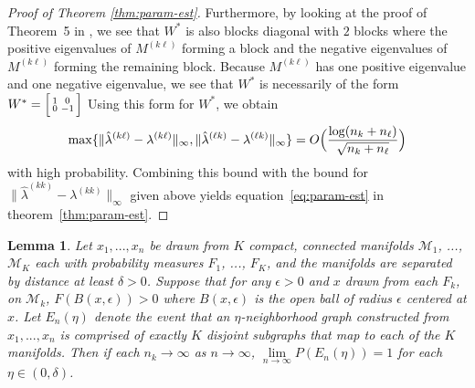 \documentclass[
  11pt,
]{article}
\newtheorem{lemma}{Lemma}[section]
\theoremstyle{definition}
\theoremstyle{definition}
\theoremstyle{definition}
\theoremstyle{definition}
\theoremstyle{remark}
\begin{document}
\begin{proof}[Proof of Theorem \ref{thm:param-est}]
Furthermore, by looking at the proof of Theorem~5 in
\citep{rubindelanchy2017statistical}, we see that $W^{*}$ is also
blocks diagonal with $2$ blocks where the positive eigenvalues of $M^{(k \ell)}$
forming a block and the negative eigenvalues of $M^{(k \ell)}$ forming
the remaining block. 
Because $M^{(k \ell)}$ has one positive eigenvalue and one negative
eigenvalue, we see that $W^{*}$ is necessarily of the form $W^{*}
= \Bigl[\begin{smallmatrix} 1 & 0 \\ 0 & - 1\end{smallmatrix}\Bigr]$
Using this form for $W^{*}$, we obtain
$$\max\{\|\hat{\lambda}^{(k \ell)} - \lambda^{(k \ell)}\|_{\infty},
\|\hat{\lambda}^{(\ell k)} - \lambda^{(\ell k)}\|_{\infty}\}  =
O\Bigl(\frac{\log(n_k + n_{\ell})}{\sqrt{n_k + n_{\ell}}}\Bigr)$$
with high probability. Combining this bound with the bound for
$\|\hat{\lambda}^{(kk)} - \lambda^{(kk)}\|_{\infty}$ given above
yields equation~\eqref{eq:param-est} in theorem~\ref{thm:param-est}. 
\end{proof}

\begin{lemma}
\label{lemma:no-noise}
Let $x_1, ..., x_n$ be drawn from $K$ compact, connected manifolds $\mathcal{M}_1$, ..., $\mathcal{M}_K$ each with probability measures $F_1$, ..., $F_K$, and the manifolds are separated by distance at least $\delta > 0$. 
Suppose that for any $\epsilon > 0$ and $x$ drawn from each $F_k$, on $\mathcal{M}_k$, $F(B(x, \epsilon)) > 0$ where $B(x, \epsilon)$ is the open ball of radius $\epsilon$ centered at $x$. 
Let $E_n(\eta)$ denote the event that an $\eta$-neighborhood graph constructed from $x_1, ..., x_n$ is comprised of exactly $K$ disjoint subgraphs that map to each of the $K$ manifolds. 
Then if each $n_k \to \infty$ as $n \to \infty$, $\lim\limits_{n \to \infty} P(E_n(\eta)) = 1$ for each $\eta \in (0, \delta)$. 
\end{lemma}
\end{document}
